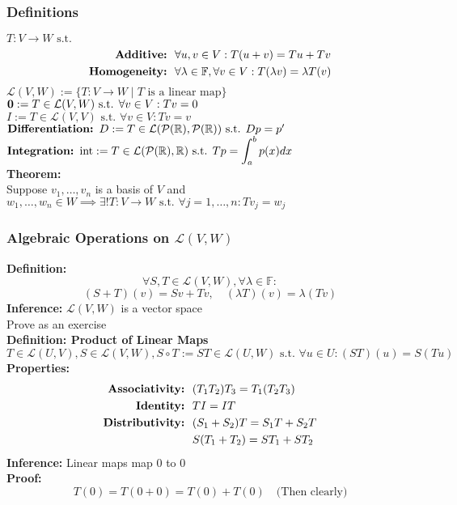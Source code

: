 \documentclass{article}
\newcommand{\R}{\mathbb{R}}
\newcommand{\F}{\mathbb{F}}
\newcommand{\st}{\mbox{ s.t. }}
\newcommand{\0}{{\bf{0}}}
\begin{document}
\subsubsection{Definitions}
$T:V\to W\st$
\begin{equation}
\begin{split}
    \mbox{\textbf{Additive: }}\,&\forall u,v\in V:T(u+v)=Tu+Tv\\
    \mbox{\textbf{Homogeneity: }}\,&\forall\lambda\in\F,\forall v\in V:T(\lambda v)=\lambda T(v)
\end{split}
\end{equation}
$\mathcal{L}(V,W):=\{T:V\to W\mid T\mbox{ is a linear map}\}$\\
$\0:=T\in\mathcal{L}(V,W)\st\forall v\in V:Tv=0$\\
$I:=T\in\mathcal{L}(V,V)\st\forall v\in V:Tv=v$\\
$\mbox{\textbf{Differentiation: }}D:=T\in\mathcal{L}(\mathcal{P}(\R),\mathcal{P}(\R))\st Dp=p'$\\
$\mbox{\textbf{Integration: }int}:=T\in\mathcal{L}(\mathcal{P}(\R),\R)\st Tp=\displaystyle\int_a^bp(x)dx$\\
\textbf{Theorem:}\\
Suppose $v_1,\dots,v_n$ is a basis of $V$ and $w_1,\dots,w_n\in W\implies\exists!T:V\to W\st\forall j=1,\dots,n:Tv_j=w_j$
\subsubsection{Algebraic Operations on $\mathcal{L}(V,W)$}
\textbf{Definition:}
$$\forall S,T\in\mathcal{L}(V,W),\forall\lambda\in\F:$$
$$(S+T)(v)=Sv+Tv,\quad (\lambda T)(v)=\lambda(Tv)$$
\textbf{Inference: }$\mathcal{L}(V,W)$ is a vector space\\
\null\hfill{Prove as an exercise}\\
\textbf{Definition: Product of Linear Maps}
$$T\in\mathcal{L}(U,V),S\in\mathcal{L}(V,W),S\circ T:=ST\in\mathcal{L}(U,W)\st\forall u\in U:(ST)(u)=S(Tu)$$
\textbf{Properties:}
\begin{equation}
\begin{split}
    \mbox{\textbf{Associativity: }}\,&(T_1T_2)T_3=T_1(T_2T_3)\\
    \mbox{\textbf{Identity: }}\,&TI=IT\\
    \mbox{\textbf{Distributivity: }}\,&(S_1+S_2)T=S_1T+S_2T\\
    &S(T_1+T_2)=ST_1+ST_2
\end{split}
\end{equation}
\textbf{Inference:} Linear maps map 0 to 0\\
\textbf{Proof:}
$$T(0)=T(0+0)=T(0)+T(0)\quad\mbox{(Then clearly)}$$
\end{document}
